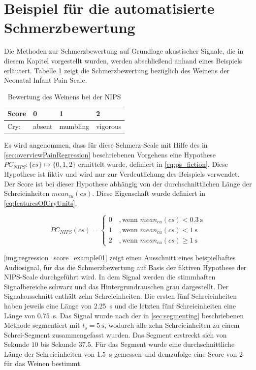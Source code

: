 \vspace{5mm}

\section{Beispiel für die automatisierte Schmerzbewertung}

Die Methoden zur Schmerzbewertung auf Grundlage akustischer Signale, die in diesem Kapitel vorgestellt wurden, werden abschließend anhand eines Beispiels erläutert. Tabelle \ref{tab:fiction_scale} zeigt die Schmerzbewertung bezüglich des Weinens der \glqq Neonatal Infant Pain Scale\grqq{}.

\begin{table}[h]
\footnotesize
\centering
\caption[Bewertung des Weinens bei der NIPS]{Bewertung des Weinens bei der NIPS \cite{nips}}
\label{tab:fiction_scale}
\begin{tabular}{@{}llll@{}}
\toprule
Score              & 0    & 1         & 2       \\ \midrule
Cry: & absent & mumbling & vigorous \\ \bottomrule
\end{tabular}
\end{table}

Es wird angenommen, dass für diese Schmerz-Scale mit Hilfe des in \autoref{sec:overviewPainRegression} beschriebenen Vorgehens eine Hypothese $PC_{NIPS}: \{cs\} \mapsto \{0,1,2\}$ ermittelt wurde, definiert in \autoref{eq:ps_fiction}. Diese Hypothese ist fiktiv und wird nur zur Verdeutlichung des Beispiels verwendet. Der Score ist bei dieser Hypothese abhängig von der durchschnittlichen Länge der Schreieinheiten $mean_{cu}(cs)$. Diese Eigenschaft wurde definiert in \autoref{eq:featuresOfCryUnits}.

\begin{equation}
PC_{NIPS}(cs) = \begin{cases}
 0 \quad ,  \text{wenn } mean_{cu}(cs) < \SI{0.3}{\second} \\
 1 \quad ,  \text{wenn } mean_{cu}(cs) < \SI{1}{\second} \\
 2 \quad ,  \text{wenn } mean_{cu}(cs) \geq \SI{1}{\second}
 \end{cases}	
 \label{eq:ps_fiction}
\end{equation}

\autoref{img:regression_score_example01} zeigt einen Ausschnitt eines beispielhaftes Audiosignal, für das die Schmerzbewertung auf Basis der fiktiven Hypothese der NIPS-Scale durchgeführt wird. In dem Signal werden die stimmhaften Signalbereiche schwarz und das Hintergrundrauschen grau dargestellt. Der Signalausschnitt enthält zehn Schreieinheiten. Die ersten fünf Schreieinheiten haben jeweils eine Länge von \SI{2.25}{\second} und die letzten fünf Schreieinheiten eine Länge von \SI{0.75}{\second}. Das Signal wurde nach der in \autoref{sec:segmenting} beschriebenen Methode segmentiert mit $t_s = \SI{5}{\second}$, wodurch alle zehn Schreieinheiten zu einem Schrei-Segment zusammengefasst wurden. Das Segment erstreckt sich von Sekunde $10$ bis Sekunde $37.5$. Für das Segment wurde eine durchschnittliche Länge der Schreieinheiten von \SI{1.5}{\second} gemessen und demzufolge eine Score von 2 für das Weinen bestimmt.

